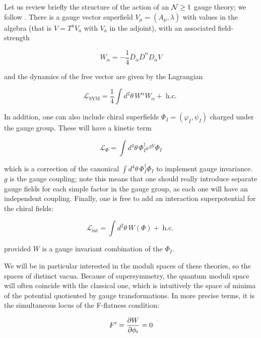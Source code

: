 Let us review briefly the structure of the action of an $\mathcal{N} \geq 1$ gauge theory; we follow \cite{wessbagger}. There is a gauge vector superfield $V_\mu = (A_\mu,\lambda)$ with values in the algebra (that is $V = T^a V_a$ with $V_a$ in the adjoint), with an associated field-strength

\begin{equation}
	W_\alpha = - \frac{1}{4} \overline{D}_{\dot \alpha} \overline{D}^{\dot \alpha} D_\alpha V
	\label{}
\end{equation}

and the dynamics of the free vector are given by the Lagrangian

\begin{equation}
	\mathcal{L}_\mathrm{SYM} = \frac{1}{4} \int d^2 \theta \,W^\alpha W_\alpha + \operatorname{h.c.}
	\label{}
\end{equation}

In addition, one can also include chiral superfields $\Phi_I = (\varphi_I, \psi_I)$ charged under the gauge group. These will have a kinetic term

\begin{equation}
	\mathcal{L}_\Phi = \int d^4\theta\, \Phi^\dagger_I e^{gV} \Phi_I
	\label{}
\end{equation}

which is a correction of the canonical $\int d^4 \theta \, \Phi^\dagger_I \Phi_I$ to implement gauge invariance. $g$ is the gauge coupling; note this means that one should really introduce separate gauge fields for each simple factor in the gauge group, as each one will have an independent coupling. Finally, one is free to add an interaction superpotential for the chiral fields:

\begin{equation}
	\mathcal{L}_\mathrm{int} = \int d^2 \theta\, W(\Phi) + \operatorname{h.c.}
	\label{}
\end{equation}

provided $W$ is a gauge invariant combination of the $\Phi_I$. 

We will be in particular interested in the moduli spaces of these theories, so the spaces of distinct vacua. Because of supersymmetry, the quantum moduli space will often coincide with the classical one, which is intuitively the space of minima of the potential quotiented by gauge transformations. In more precise terms, it is the simultaneous locus of the F-flatness condition:

\begin{equation}
	F^i = \frac{\partial W}{\partial\phi_i} = 0
	\label{}
\end{equation}

